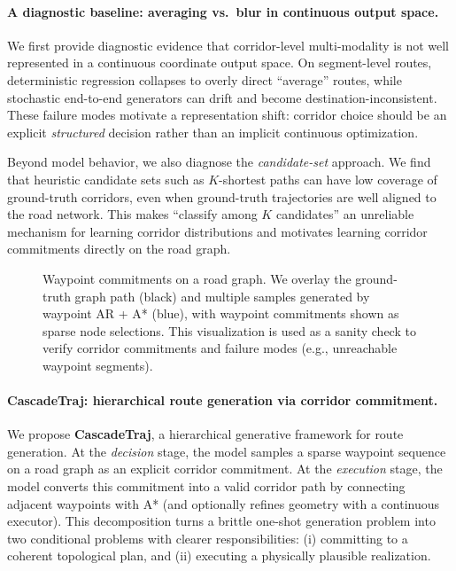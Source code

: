 \paragraph{A diagnostic baseline: averaging vs.\ blur in continuous output space.}
We first provide diagnostic evidence that corridor-level multi-modality is not well represented in a continuous coordinate output space.
On segment-level routes, deterministic regression collapses to overly direct ``average'' routes, while stochastic end-to-end generators can drift and become destination-inconsistent.
These failure modes motivate a representation shift: corridor choice should be an explicit \emph{structured} decision rather than an implicit continuous optimization.

Beyond model behavior, we also diagnose the \emph{candidate-set} approach.
We find that heuristic candidate sets such as $K$-shortest paths can have low coverage of ground-truth corridors, even when ground-truth trajectories are well aligned to the road network.
This makes ``classify among $K$ candidates'' an unreliable mechanism for learning corridor distributions and motivates learning corridor commitments directly on the road graph.

\begin{figure}[t]
  \centering
  \caption{Waypoint commitments on a road graph. We overlay the ground-truth graph path (black) and multiple samples generated by waypoint AR + A* (blue), with waypoint commitments shown as sparse node selections. This visualization is used as a sanity check to verify corridor commitments and failure modes (e.g., unreachable waypoint segments).}
  \label{fig:wp-ar-astar}
\end{figure}

\paragraph{CascadeTraj: hierarchical route generation via corridor commitment.}
We propose \textbf{CascadeTraj}, a hierarchical generative framework for route generation.
At the \emph{decision} stage, the model samples a sparse waypoint sequence on a road graph as an explicit corridor commitment.
At the \emph{execution} stage, the model converts this commitment into a valid corridor path by connecting adjacent waypoints with A* (and optionally refines geometry with a continuous executor).
This decomposition turns a brittle one-shot generation problem into two conditional problems with clearer responsibilities: (i) committing to a coherent topological plan, and (ii) executing a physically plausible realization.


